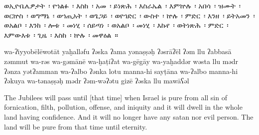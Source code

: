 
\clearpage
\begin{ethiopictext}
    ወኢዮቤሌዎታት~፡ የኀልፉ~፡ እስከ~፡ አመ~፡ ይነጽሕ~፡ እስራኤል~፡
    እምኵሉ~፡ አበሳ~፡ ዝሙት~፡ ወርኵስ~፡ ወግማኔ~፡ ወኀጢአት~፡ ወጌጋይ~፡ 
    ወየኀድር~፡ ውስተ~፡ ኵሉ~፡ ምድር~፡ እንዘ~፡ ይትአመን~፡ ወአልቦ~፡
    እንከ~፡ ሎቱ~፡ መነሂ~፡ ሰይጣነ~፡ ወአልቦ~፡ መነሂ~፡ እኩየ~፡ ወትነጽሕ~፡ 
    ምድር~፡ እምውእቱ~፡ ጊዜ~፡ እስከ~፡ ኵሉ~፡ መዋዕል~።
\end{ethiopictext}

\begin{transliteration}
    wa-ʔiyyobēlēwotāt yaḫalləfu ʔəska ʔama yənaṣṣəḥ ʔəsrāʔēl
    ʔəm llu ʔabbasā zəmmut wa-rə\kw{}s wa-gəmānē wa-ḫaṭiʔat wa-gēgāy
    wa-yaḫaddər wəsta llu mədr ʔənza yətʔamman wa-ʔalbo
    ʔənka lotu manna-hi sayṭāna wa-ʔalbo manna-hi ʔəkuya wa-tənaṣṣəḥ
    mədr ʔəm-wəʔətu gizē ʔəska llu mawāʕəl
\end{transliteration}

\begin{translation}
    The Jubilees will pass until [that time] when Israel is pure
    from all sin of fornication, filth, pollution, offense, and iniquity
    and it will dwell in the whole land having confidence. And it will no longer have
    any satan nor evil person. The land will be pure from that time until eternity.
\end{translation}